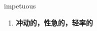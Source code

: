 
\begin{frame}
{\huge impetuous}
\begin{center}
\begin{enumerate}\Large
  \item \textbf{冲动的，性急的，轻率的}
\end{enumerate}
\end{center}
\end{frame}
